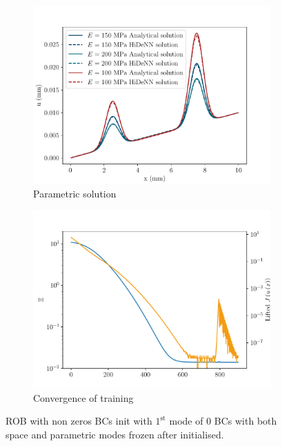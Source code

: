 \begin{figure}
\begin{subfigure}[t]{0.5\linewidth}
    \includegraphics[width=\linewidth]{Figures/Para_displacementsROM_1Para_np_50_order_1_nmodes_1_npara_1BCs_init_all_frozen.pdf}
    \caption{Parametric solution}
\end{subfigure} 
  \begin{subfigure}[t]{0.5\linewidth}
    \centering
    \includegraphics[width=\linewidth]{Figures/Non0BCs_init_frozen_parafrozen.pdf}
    \caption{Convergence of training}
\end{subfigure} 
\caption{ROB with non zeros BCs init with $1^{\text{st}}$ mode of $0$ BCs with both space and parametric modes frozen after initialised.}
    \label{fig:BCsInitFrozen_parfrozen}
\end{figure}

